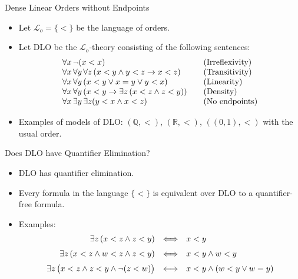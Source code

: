 \documentclass[aspectratio=169,11pt]{beamer}
\begin{document}
\begin{frame}{Dense Linear Orders without Endpoints}
  \small
  \begin{itemize}
    \item Let \(\mathcal{L}_o = \{<\}\) be the language of orders.
    \item Let DLO be the $\mathcal{L}_o$-theory consisting of the following sentences:
      \[
      \begin{array}{@{}l@{\qquad}l@{}}
        \forall x\, \neg (x < x) &
          \text{(Irreflexivity)} \\
        \forall x\,\forall y\,\forall z\, (x < y \wedge y < z \to x < z) &
          \text{(Transitivity)} \\
        \forall x\,\forall y\, (x < y \vee x = y \vee y < x) &
          \text{(Linearity)} \\
        \forall x\,\forall y\, (x < y \to \exists z\, (x < z \wedge z < y)) &
          \text{(Density)} \\
        \forall x\,\exists y\, \exists z (y < x \wedge x < z) &
          \text{(No endpoints)}
      \end{array}
      \]
    \item Examples of models of DLO: \((\mathbb{Q}, <)\), \((\mathbb{R}, <)\), \(((0, 1), <)\) with the usual order.
  \end{itemize}
\end{frame}

\begin{frame}{Does DLO have Quantifier Elimination?}
  \small
  \begin{itemize}
    \item DLO has quantifier elimination.
    \item Every formula in the language \(\{<\}\) is equivalent over DLO to a quantifier-free formula.
    \item Examples:
        \[
      \begin{array}{@{}rcl@{}}
        \exists z\, (x < z \wedge z < y)
          &\Longleftrightarrow& x < y \\[0.6em]
        \exists z\, (x < z \wedge w < z \wedge z < y)
          &\Longleftrightarrow& x < y \wedge w < y \\[0.6em]
        \exists z\, \bigl(x < z \wedge z < y \wedge \neg(z < w)\bigr)
          &\Longleftrightarrow& x < y \wedge (w < y \vee w = y)
      \end{array}
      \]
  \end{itemize}
\end{frame}
\end{document}
